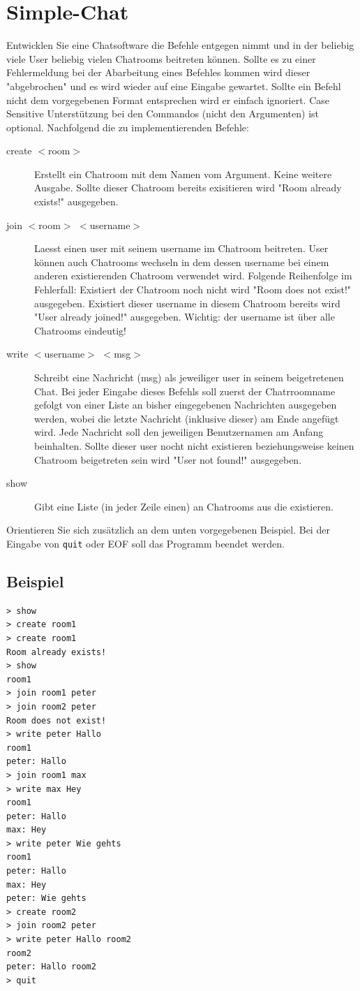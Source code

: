 \documentclass[a4paper,10pt]{article}
\begin{document}
\section*{Simple-Chat}

Entwicklen Sie eine Chatsoftware die Befehle entgegen nimmt und in der beliebig viele User beliebig vielen Chatrooms beitreten können.
Sollte es zu einer Fehlermeldung bei der Abarbeitung eines Befehles kommen
wird dieser "abgebrochen" und es wird wieder auf eine Eingabe gewartet.
Sollte ein Befehl nicht dem vorgegebenen Format entsprechen wird er einfach ignoriert. Case Sensitive Unterstützung bei den Commandos (nicht den Argumenten) ist optional.
Nachfolgend die zu implementierenden Befehle:

\begin{description}
 \item[create $<$room$>$] Erstellt ein Chatroom mit dem Namen vom Argument. Keine weitere Ausgabe. Sollte dieser Chatroom bereits exisitieren wird "Room already exists!" ausgegeben.
 \item[join $<$room$>$ $<$username$>$] Laesst einen user mit seinem username im Chatroom beitreten. User können auch Chatrooms wechseln in dem dessen username bei einem anderen existierenden Chatroom verwendet wird.
  Folgende Reihenfolge im Fehlerfall: Existiert der Chatroom noch nicht wird "Room does not exist!"
 ausgegeben. Existiert dieser username in diesem Chatroom bereits wird "User already joined!" ausgegeben. Wichtig: der username ist über alle Chatrooms eindeutig!
 \item[write $<$username$>$ $<$msg$>$] Schreibt eine Nachricht (msg) als jeweiliger user in seinem beigetretenen Chat. Bei jeder Eingabe dieses Befehls soll zuerst der Chatrroomname gefolgt 
 von einer Liste an bisher eingegebenen Nachrichten
 ausgegeben werden, wobei die letzte Nachricht (inklusive dieser) am Ende angefügt wird. Jede Nachricht soll den jeweiligen Benutzernamen am Anfang beinhalten. Sollte dieser user nocht nicht existieren beziehungsweise keinen Chatroom
 beigetreten sein wird "User not found!" ausgegeben.
 \item[show] Gibt eine Liste (in jeder Zeile einen) an Chatrooms aus die existieren.
\end{description}

Orientieren Sie sich zusätzlich an dem unten vorgegebenen Beispiel. Bei der Eingabe von \texttt{quit} oder EOF soll das Programm beendet werden.

\subsection*{Beispiel}
\begin{verbatim}
> show
> create room1
> create room1
Room already exists!
> show
room1
> join room1 peter
> join room2 peter
Room does not exist!
> write peter Hallo
room1
peter: Hallo
> join room1 max
> write max Hey
room1
peter: Hallo
max: Hey
> write peter Wie gehts
room1
peter: Hallo
max: Hey
peter: Wie gehts
> create room2
> join room2 peter
> write peter Hallo room2
room2
peter: Hallo room2
> quit
\end{verbatim}
\end{document}
